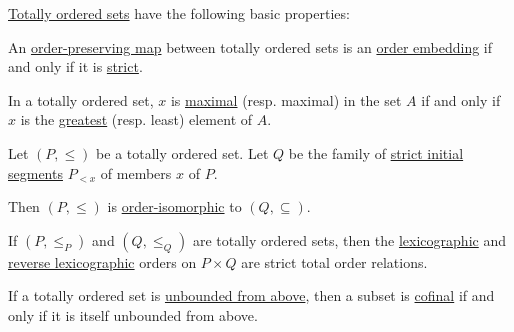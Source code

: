 \begin{proposition}\label{thm:def:totally_ordered_set}
  \hyperref[def:totally_ordered_set]{Totally ordered sets} have the following basic properties:
  \begin{thmenum}
     An \hyperref[def:order_function/preserving]{order-preserving map} between totally ordered sets is an \hyperref[def:partially_ordered_set/morphism]{order embedding} if and only if it is \hyperref[def:order_function/preserving]{strict}.

     In a totally ordered set, \( x \) is \hyperref[def:extremal_points/maximal_and_minimal_element]{maximal} (resp. maximal) in the set \( A \) if and only if \( x \) is the \hyperref[def:extremal_points/maximum_and_minimum]{greatest} (resp. least) element of \( A \).

     Let \( (P, \leq) \) be a totally ordered set. Let \( Q \) be the family of \hyperref[def:order_interval/unbounded]{strict initial segments} \( P_{<x} \) of members \( x \) of \( P \).

    Then \( (P, \leq) \) is \hyperref[def:partially_ordered_set/morphism]{order-isomorphic} to \( (Q, \subseteq) \).

     If \( (P, \leq_P) \) and \( (Q, \leq_Q) \) are totally ordered sets, then the \hyperref[eq:def:lexicographic_order]{lexicographic} and \hyperref[eq:def:lexicographic_order/reverse]{reverse lexicographic} orders on \( P \times Q \) are strict total order relations.

     If a totally ordered set is \hyperref[def:extremal_points/bounds]{unbounded from above}, then a subset is \hyperref[def:cofinal_set]{cofinal} if and only if it is itself unbounded from above.
  \end{thmenum}
\end{proposition}
